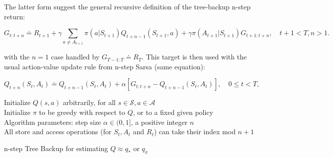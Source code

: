 \documentclass[11pt]{article}
\begin{document}
The latter form suggest the general recursive definition of the tree-backup
n-step return:

\begin{equation}
G_{t:t+n} \doteq R_{t+1} + \gamma \sum\limits_{a \neq A_{t+1}} \pi(a|S_{t+1})Q_{t+n-1}(S_{t+1},a) +
\gamma \pi(A_{t+1}|S_{t+1}) G_{t+1:t+n}, \quad t+1<T, n>1.
\end{equation}

with the \(n=1\) case handled by \(G_{T-1:T} \doteq R_T\). This target is then used
with the usual action-value update rule from n-step Sarsa (same equation):

\begin{equation}
Q_{t+n}(S_t, A_t) \doteq Q_{t+n-1}(S_t, A_t) + \alpha [G_{t:t+n} - Q_{t+n-1}(S_t, A_t)], \quad 0 \leq t < T,
\end{equation}

\begin{algorithm}[H]
Initialize $Q(s,a)$ arbitrarily, for all $s \in \mathcal{S}, a \in \mathcal{A}$ \\
Initialize $\pi$ to be greedy with respect to $Q$, or to a fixed given policy \\
Algorithm parameters: step size $\alpha \in (0,1]$, a positive integer $n$ \\
All store and access operations (for $S_t, A_t$ and $R_t$) can take their index mod $n + 1$ \\
\;
\;
\caption{n-step Tree Backup for estimating $Q \approx q_*$ or $q_\pi$}
\end{algorithm}
\end{document}
